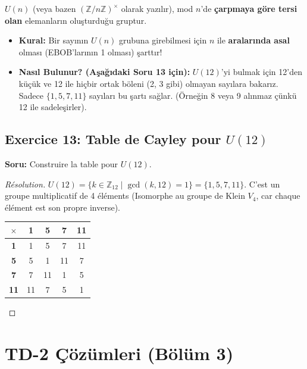 \documentclass[12pt,a4paper]{report}
\begin{document}
\begin{tcolorbox}[colback=yellow!5!white,colframe=yellow!75!black,title=Hatırlatma: Tersinir Elemanlar Grubu $U(n)$]
$U(n)$ (veya bazen $(\mathbb{Z}/n\mathbb{Z})^\times$ olarak yazılır), mod $n$'de \textbf{çarpmaya göre tersi olan} elemanların oluşturduğu gruptur.
\begin{itemize}
    \item \textbf{Kural:} Bir sayının $U(n)$ grubuna girebilmesi için $n$ ile \textbf{aralarında asal} olması (EBOB'larının 1 olması) şarttır!
    \item \textbf{Nasıl Bulunur? (Aşağıdaki Soru 13 için):} $U(12)$'yi bulmak için 12'den küçük ve 12 ile hiçbir ortak böleni (2, 3 gibi) olmayan sayılara bakarız. Sadece $\{1, 5, 7, 11\}$ sayıları bu şartı sağlar. (Örneğin 8 veya 9 alınmaz çünkü 12 ile sadeleşirler).
\end{itemize}
\end{tcolorbox}

\subsection*{Exercice 13: Table de Cayley pour $U(12)$}
\textbf{Soru:} Construire la table pour $U(12)$.
\begin{proof}[Résolution]
$U(12) = \{ k \in \mathbb{Z}_{12} \mid \gcd(k, 12) = 1 \} = \{1, 5, 7, 11\}$. 
C'est un groupe multiplicatif de 4 éléments (Isomorphe au groupe de Klein $V_4$, car chaque élément est son propre inverse).
\begin{center}
\begin{tabular}{|c||c|c|c|c|}
\hline
$\times$ & \textbf{1} & \textbf{5} & \textbf{7} & \textbf{11} \\
\hline\hline
\textbf{1} & 1 & 5 & 7 & 11 \\
\hline
\textbf{5} & 5 & 1 & 11 & 7 \\
\hline
\textbf{7} & 7 & 11 & 1 & 5 \\
\hline
\textbf{11} & 11 & 7 & 5 & 1 \\
\hline
\end{tabular}
\end{center}
\end{proof}

\section{TD-2 Çözümleri (Bölüm 3)}
\end{document}
